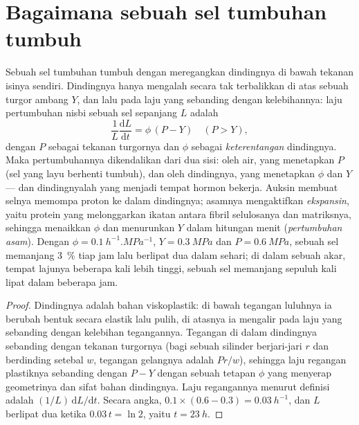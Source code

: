 \section{Bagaimana sebuah sel tumbuhan tumbuh}

\begin{theorem}\label{thm:b2:plant-meristems:lockhart}
Sebuah sel tumbuhan tumbuh dengan meregangkan dindingnya di bawah
tekanan isinya sendiri. Dindingnya hanya mengalah secara tak terbalikkan
di atas sebuah turgor ambang $Y$, dan lalu pada laju yang sebanding
dengan kelebihannya: laju pertumbuhan nisbi sebuah sel sepanjang $L$
adalah
\[
\frac{1}{L}\frac{\mathrm{d}L}{\mathrm{d}t} = \phi\,(P - Y) \quad (P > Y),
\]
dengan $P$ sebagai tekanan turgornya dan $\phi$ sebagai
\emph{keterentangan} dindingnya. Maka pertumbuhannya dikendalikan dari
dua sisi: oleh air, yang menetapkan $P$ (sel yang layu berhenti
tumbuh), dan oleh dindingnya, yang menetapkan $\phi$ dan $Y$ --- dan
dindingnyalah yang menjadi tempat hormon bekerja. Auksin membuat selnya
memompa proton ke dalam dindingnya; asamnya mengaktifkan
\emph{ekspansin}, yaitu protein yang melonggarkan ikatan antara fibril
selulosanya dan matriksnya, sehingga menaikkan $\phi$ dan menurunkan
$Y$ dalam hitungan menit (\emph{pertumbuhan asam}). Dengan $\phi =
\qty{0.1}{h^{-1}.MPa^{-1}}$, $Y = \qty{0.3}{MPa}$ dan $P =
\qty{0.6}{MPa}$, sebuah sel memanjang \qty{3}{\%} tiap jam lalu berlipat
dua dalam sehari; di dalam  sebuah akar, tempat lajunya
beberapa kali lebih tinggi, sebuah sel memanjang sepuluh kali lipat
dalam beberapa jam.
\end{theorem}
\begin{proof}
Dindingnya adalah bahan viskoplastik: di bawah tegangan luluhnya ia
berubah bentuk secara elastik lalu pulih, di atasnya ia mengalir pada
laju yang sebanding dengan kelebihan tegangannya. Tegangan di dalam
dindingnya sebanding dengan tekanan turgornya (bagi sebuah silinder
berjari-jari $r$ dan berdinding setebal $w$, tegangan gelangnya adalah
$Pr/w$), sehingga laju regangan plastiknya sebanding dengan $P - Y$
dengan sebuah tetapan $\phi$ yang menyerap geometrinya dan sifat bahan
dindingnya. Laju regangannya menurut definisi adalah
$(1/L)\,\mathrm{d}L/\mathrm{d}t$. Secara angka,
$0.1\times(0.6 - 0.3) = \qty{0.03}{h^{-1}}$, dan $L$ berlipat dua
ketika $0.03\,t = \ln 2$, yaitu $t = \qty{23}{h}$.
\end{proof}

